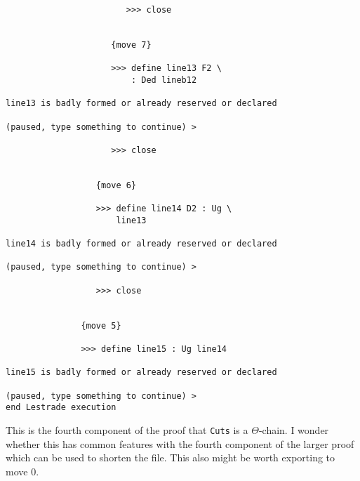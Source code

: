 \documentclass[12pt]{article}
\begin{document}
\begin{verbatim}
                        >>> close


                     {move 7}

                     >>> define line13 F2 \
                         : Ded lineb12

line13 is badly formed or already reserved or declared

(paused, type something to continue) >

                     >>> close


                  {move 6}

                  >>> define line14 D2 : Ug \
                      line13

line14 is badly formed or already reserved or declared

(paused, type something to continue) >

                  >>> close


               {move 5}

               >>> define line15 : Ug line14

line15 is badly formed or already reserved or declared

(paused, type something to continue) >
end Lestrade execution
\end{verbatim}

This is the fourth component of the proof that {\tt Cuts} is a $\Theta$-chain.  I wonder whether this has common features with the fourth component of the larger proof
which can be used to shorten the file.  This also might be worth exporting to move 0.
\end{document}
